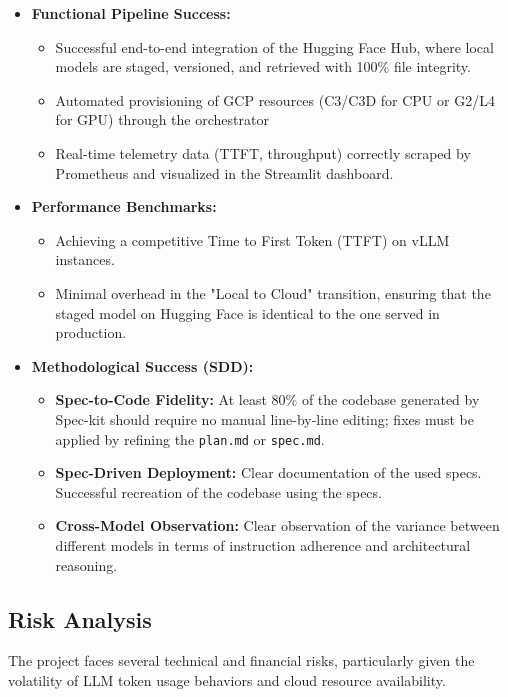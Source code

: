\documentclass[a4paper,12pt]{report}
\begin{document}
\begin{itemize}
    \item \textbf{Functional Pipeline Success:}
    \begin{itemize}
        \item Successful end-to-end integration of the Hugging Face Hub, where local models are staged, versioned, and retrieved with 100\% file integrity.
        \item Automated provisioning of GCP resources (C3/C3D for CPU or G2/L4 for GPU) through the orchestrator 
        \item Real-time telemetry data (TTFT, throughput) correctly scraped by Prometheus and visualized in the Streamlit dashboard.
    \end{itemize}
    
    \item \textbf{Performance Benchmarks:}
    \begin{itemize}
        \item Achieving a competitive Time to First Token (TTFT) on vLLM instances.
        \item Minimal overhead in the "Local to Cloud" transition, ensuring that the staged model on Hugging Face is identical to the one served in production.
    \end{itemize}

    \item \textbf{Methodological Success (SDD):}
    \begin{itemize}
        \item \textbf{Spec-to-Code Fidelity:} At least 80\% of the codebase generated by Spec-kit should require no manual line-by-line editing; fixes must be applied by refining the \texttt{plan.md} or \texttt{spec.md}.
        \item \textbf{Spec-Driven Deployment:} Clear documentation of the used specs. Successful recreation of the codebase using the specs. 
        \item \textbf{Cross-Model Observation:} Clear observation of the variance between different models in terms of instruction adherence and architectural reasoning.
    \end{itemize}
\end{itemize}

\subsection{Risk Analysis}
The project faces several technical and financial risks, particularly given the volatility of LLM token usage behaviors and cloud resource availability.
\end{document}
